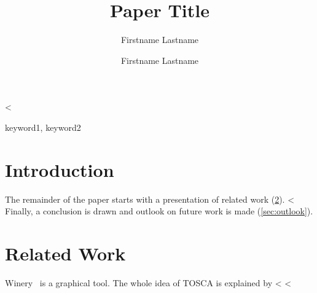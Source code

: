 \documentclass[runningheads,a4paper,english]{llncs}[2018/03/10]
\begin{document}
<%

\title{Paper Title}

\author{Firstname Lastname \and Firstname Lastname}



%
%

\maketitle

\begin{abstract}
  \lipsum[1]
\end{abstract}

\begin{keywords}
  keyword1, keyword2
\end{keywords}

\section{Introduction}
\label{sec:intro}
\lipsum[1-3]

The remainder of the paper starts with a presentation of related work (\cref{sec:relatedwork}).
<%
Finally, a conclusion is drawn and outlook on future work is made (\cref{sec:outlook}).

\section{Related Work}
\label{sec:relatedwork}

Winery~\cite{Winery} is a graphical  tool.
The whole idea of TOSCA is explained by <%
<%
\end{document}
